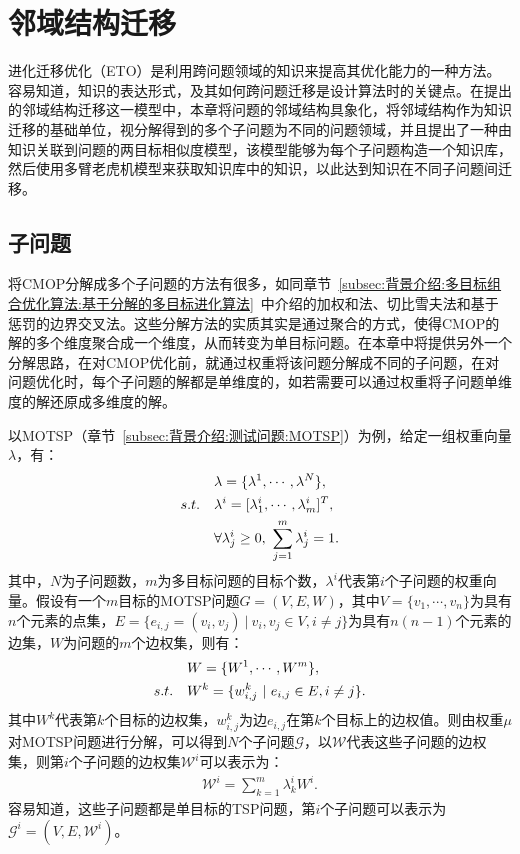 \section{邻域结构迁移}
\label{sec:NST:邻域结构迁移}
进化迁移优化（ETO）是利用跨问题领域的知识来提高其优化能力的一种方法。容易知道，知识的表达形式，及其如何跨问题迁移是设计算法时的关键点。在提出的邻域结构迁移这一模型中，本章将问题的邻域结构具象化，将邻域结构作为知识迁移的基础单位，视分解得到的多个子问题为不同的问题领域，并且提出了一种由知识关联到问题的两目标相似度模型，该模型能够为每个子问题构造一个知识库，然后使用多臂老虎机模型来获取知识库中的知识，以此达到知识在不同子问题间迁移。

\subsection{子问题}
\label{subsec:NST:邻域结构迁移:子问题}
将CMOP分解成多个子问题的方法有很多，如同章节~\ref{subsec:背景介绍:多目标组合优化算法:基于分解的多目标进化算法}~中介绍的加权和法、切比雪夫法和基于惩罚的边界交叉法。这些分解方法的实质其实是通过聚合的方式，使得CMOP的解的多个维度聚合成一个维度，从而转变为单目标问题。在本章中将提供另外一个分解思路，在对CMOP优化前，就通过权重将该问题分解成不同的子问题，在对问题优化时，每个子问题的解都是单维度的，如若需要可以通过权重将子问题单维度的解还原成多维度的解。
\par
以MOTSP（章节~\ref{subsec:背景介绍:测试问题:MOTSP}）为例，给定一组权重向量$\lambda$，有：
\begin{align}
    \label{eq:NST:权重向量}
    & \lambda = \{ \lambda^1, \cdots, \lambda^N \}, \\
    s.t. \quad & \lambda^{i} = [ \lambda^{i}_1, \cdots, \lambda^{i}_m ]^T, \notag \\
    & \forall \lambda^{i}_j \geq 0, \ \sum_{j=1}^m \lambda^{i}_j = 1. \notag
\end{align}
其中，$N$为子问题数，$m$为多目标问题的目标个数，$\lambda^{i}$代表第$i$个子问题的权重向量。假设有一个$m$目标的MOTSP问题$G = (V, E, W)$，其中$V = \{v_1, \cdots, v_n\}$为具有$n$个元素的点集，$E = \{ e_{i,j} = (v_i, v_j) \ | \ v_i, v_j \in V, i \not = j \}$为具有$n(n-1)$个元素的边集，$W$为问题的$m$个边权集，则有：
\begin{align}
    \label{eq:NST:边权矩阵}
    & W = \{ W^1, \cdots, W^m \}, \\
    s.t. \quad & W^k = \{ w^k_{i,j} \ | \ e_{i,j} \in E, i \not = j \}. \notag
\end{align}
其中$W^k$代表第$k$个目标的边权集，$w^k_{i,j}$为边$e_{i,j}$在第$k$个目标上的边权值。则由权重$\mu$对MOTSP问题进行分解，可以得到$N$个子问题$\mathcal{G}$，以$\mathcal{W}$代表这些子问题的边权集，则第$i$个子问题的边权集$\mathcal{W}^i$可以表示为：
\begin{align}
    \label{eq:NST:SP}
    \mathcal{W}^i = \sum_{k=1}^m  \lambda^{i}_k W^i.
\end{align}
容易知道，这些子问题都是单目标的TSP问题，第$i$个子问题可以表示为$\mathcal{G}^i = (V, E, \mathcal{W}^i)$。


